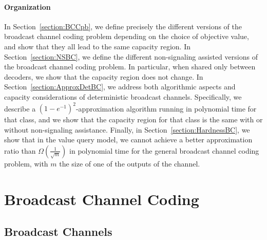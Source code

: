 \paragraph{Organization} In Section~\ref{section:BCCpb}, we define precisely the different versions of the broadcast channel coding problem depending on the choice of objective value, and show that they all lead to the same capacity region. In Section~\ref{section:NSBC}, we define the different non-signaling assisted versions of the broadcast channel coding problem. In particular, when shared only between decoders, we show that the capacity region does not change. In Section~\ref{section:ApproxDetBC}, we address both algorithmic aspects and capacity considerations of deterministic broadcast channels. Specifically, we describe a $(1-e^{-1})^2$-approximation algorithm running in polynomial time for that class, and we show that the capacity region for that class is the same with or without non-signaling assistance. Finally, in Section~\ref{section:HardnessBC}, we show that in the value query model, we cannot achieve a better approximation ratio than $\Omega\left(\frac{1}{\sqrt{m}}\right)$ in polynomial time for the general broadcast channel coding problem, with $m$ the size of one of the outputs of the channel.

\section{Broadcast Channel Coding}
\label{section:BCCpb}
\subsection{Broadcast Channels}

